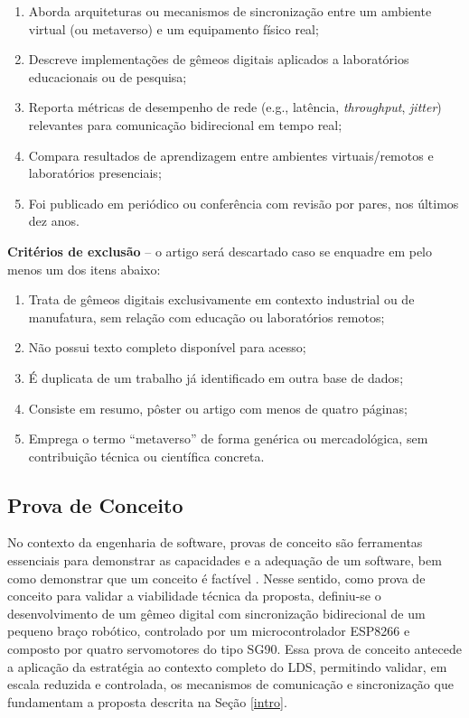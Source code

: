 \documentclass[12pt]{article}
\begin{document}
\begin{enumerate}
    \item Aborda arquiteturas ou mecanismos de sincronização entre um ambiente virtual (ou metaverso) e um equipamento físico real;
    \item Descreve implementações de gêmeos digitais aplicados a laboratórios educacionais ou de pesquisa;
    \item Reporta métricas de desempenho de rede (e.g., latência, \textit{throughput}, \textit{jitter}) relevantes para comunicação bidirecional em tempo real;
    \item Compara resultados de aprendizagem entre ambientes virtuais/remotos e laboratórios presenciais;
    \item Foi publicado em periódico ou conferência com revisão por pares, nos últimos dez anos.
\end{enumerate}

\textbf{Critérios de exclusão} -- o artigo será descartado caso se enquadre em pelo menos um dos itens abaixo:

\begin{enumerate}
    \item Trata de gêmeos digitais exclusivamente em contexto industrial ou de manufatura, sem relação com educação ou laboratórios remotos;
    \item Não possui texto completo disponível para acesso;
    \item É duplicata de um trabalho já identificado em outra base de dados;
    \item Consiste em resumo, pôster ou artigo com menos de quatro páginas;
    \item Emprega o termo ``metaverso'' de forma genérica ou mercadológica, sem contribuição técnica ou científica concreta.
\end{enumerate}

\subsection{Prova de Conceito}
\label{subsec:poc}

No contexto da engenharia de software, provas de conceito são ferramentas essenciais para demonstrar as capacidades e a adequação de um software, bem como demonstrar que um conceito é factível \cite[p.~1]{kottapalle_poc}. Nesse sentido, como prova de conceito para validar a viabilidade técnica da proposta, definiu-se o desenvolvimento de um gêmeo digital com sincronização bidirecional de um pequeno braço robótico, controlado por um microcontrolador ESP8266 e composto por quatro servomotores do tipo SG90. Essa prova de conceito antecede a aplicação da estratégia ao contexto completo do LDS, permitindo validar, em escala reduzida e controlada, os mecanismos de comunicação e sincronização que fundamentam a proposta descrita na Seção \ref{intro}.
\end{document}
